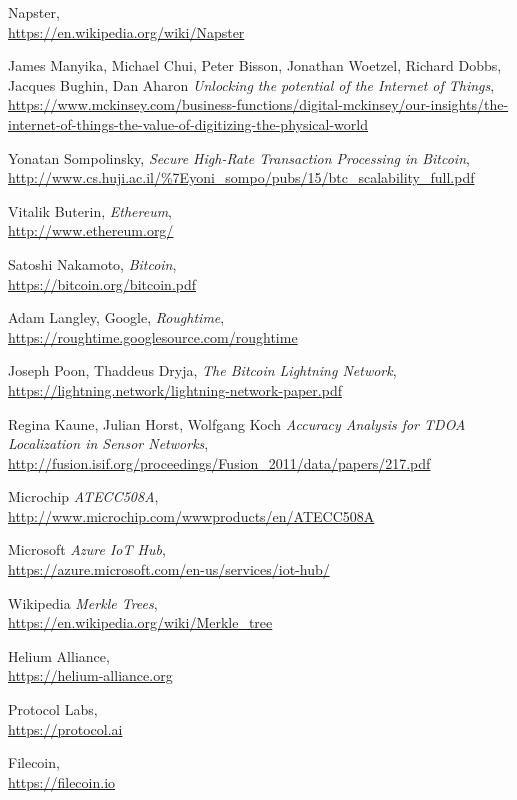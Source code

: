 \documentclass[letterpaper,11pt]{article}
\begin{document}
\begin{thebibliography}{9}

	Napster, \\
		\url{https://en.wikipedia.org/wiki/Napster}

	James Manyika, Michael Chui, Peter Bisson, Jonathan Woetzel, Richard Dobbs, Jacques Bughin, Dan Aharon
		\textit{Unlocking the potential of the Internet of Things}, \\
		\url{https://www.mckinsey.com/business-functions/digital-mckinsey/our-insights/the-internet-of-things-the-value-of-digitizing-the-physical-world}

	Yonatan Sompolinsky,
		\textit{Secure High-Rate Transaction Processing in Bitcoin}, \\
		\url{http://www.cs.huji.ac.il/\%7Eyoni\_sompo/pubs/15/btc\_scalability\_full.pdf}

	Vitalik Buterin,
		\textit{Ethereum},\\
		\url{http://www.ethereum.org/}

	Satoshi Nakamoto,
		\textit{Bitcoin}, \\
		\url{https://bitcoin.org/bitcoin.pdf}

	Adam Langley, Google,
		\textit{Roughtime}, \\
		\url{https://roughtime.googlesource.com/roughtime}

	Joseph Poon, Thaddeus Dryja,
		\textit{The Bitcoin Lightning Network}, \\
		\url{https://lightning.network/lightning-network-paper.pdf}

	Regina Kaune, Julian Horst, Wolfgang Koch
		\textit{Accuracy Analysis for TDOA Localization in Sensor Networks}, \\
		\url{http://fusion.isif.org/proceedings/Fusion_2011/data/papers/217.pdf}	

	Microchip
		\textit{ATECC508A}, \\
		\url{http://www.microchip.com/wwwproducts/en/ATECC508A}

	Microsoft
		\textit{Azure IoT Hub}, \\
		\url{https://azure.microsoft.com/en-us/services/iot-hub/}

	Wikipedia
		\textit{Merkle Trees}, \\
		\url{https://en.wikipedia.org/wiki/Merkle_tree}

	Helium Alliance, \\
		\url{https://helium-alliance.org}

	Protocol Labs, \\
		\url{https://protocol.ai}

	Filecoin, \\
		\url{https://filecoin.io}

\end{thebibliography}
\end{document}
